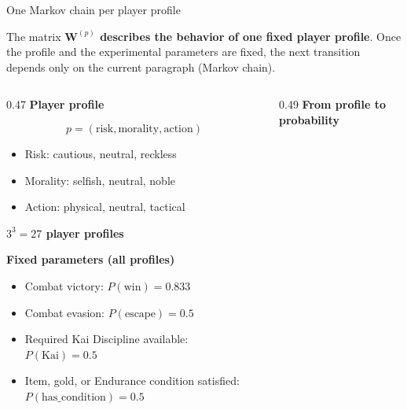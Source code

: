 \documentclass{beamer}
\newcommand{\imp}[1]{\textbf{\color{cyan}#1}}
\begin{document}
	\begin{frame}{One Markov chain per player profile}
		
		\scriptsize
		
		The matrix \imp{$\mathbf{W}^{(p)}$ describes the behavior of one fixed player profile}.
		Once the profile and the experimental parameters are fixed, the next
		transition depends only on the current paragraph (Markov chain).
		
		\vspace{0.2cm}
		
		\begin{columns}[T,onlytextwidth]
			
			\begin{column}{0.47\textwidth}
				\textbf{Player profile}
				
				\vspace{-0.3cm}
				$$
				p=(\text{risk},\text{morality},\text{action})
				$$
				
				{\scriptsize
					\begin{itemize}
						\item Risk: cautious, neutral, reckless
						\item Morality: selfish, neutral, noble
						\item Action: physical, neutral, tactical
					\end{itemize}
				}
				
				\centering
				\imp{$3^3=27$ player profiles}
				
				\vspace{0.25cm}
				
				\raggedright
				\textbf{Fixed parameters (all profiles)}
				
				\vspace{0.05cm}
				
				{\tiny
					\begin{itemize}
						\item Combat victory: $P(\mathrm{win})=0.833$
						\item Combat evasion: $P(\mathrm{escape})=0.5$
						\item Required Kai Discipline available: $P(\mathrm{Kai})=0.5$
						\item Item, gold, or Endurance condition satisfied:
						$P(\mathrm{has\_condition})=0.5$
					\end{itemize}
				}
			\end{column}
			
			\begin{column}{0.49\textwidth}
				\textbf{From profile to probability}
				

\end{column}
\end{columns}
\end{frame}
\end{document}
